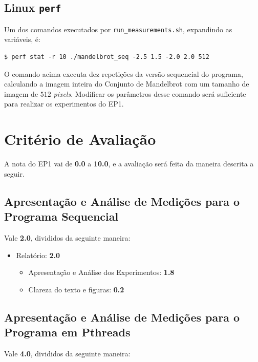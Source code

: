\documentclass[final,12pt,a4paper]{elsarticle}
\begin{document}
\subsection{Linux \texttt{perf}}

Um dos comandos executados por \texttt{run\_measurements.sh}, expandindo as
variáveis, é:

\begin{lstlisting}
$ perf stat -r 10 ./mandelbrot_seq -2.5 1.5 -2.0 2.0 512
\end{lstlisting}

O comando acima executa dez repetições da versão sequencial do programa,
calculando a imagem inteira do Conjunto de Mandelbrot com um tamanho de imagem
de $512$ \textit{pixels}. Modificar os parâmetros desse comando será suficiente
para realizar os experimentos do EP1.

\section{Critério de Avaliação}

A nota do EP1 vai de \textbf{0.0} a \textbf{10.0}, e a avaliação será feita da
maneira descrita a seguir.

\subsection{Apresentação e Análise de Medições para o Programa Sequencial}

Vale \textbf{2.0}, divididos da seguinte maneira:

\begin{itemize}
    \item Relatório: \textbf{2.0}
    \begin{itemize}
        \item Apresentação e Análise dos Experimentos: \textbf{1.8}
        \item Clareza do texto e figuras: \textbf{0.2}
    \end{itemize}
\end{itemize}

\subsection{Apresentação e Análise de Medições para o Programa em Pthreads}

Vale \textbf{4.0}, divididos da seguinte maneira:
\end{document}
